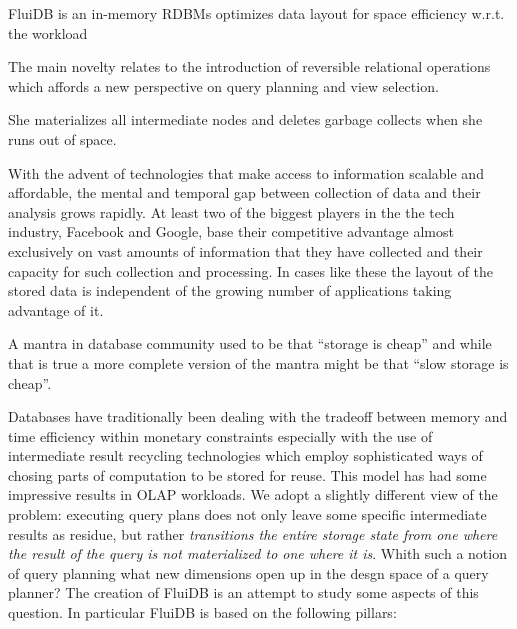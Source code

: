 
\begin{summary}
\item FluiDB is an in-memory RDBMs optimizes data layout for space
  efficiency w.r.t. the workload
\item The main novelty relates to the introduction of reversible
  relational operations which affords a new perspective on query
  planning and view selection.
\item She materializes all intermediate nodes and deletes garbage
  collects when she runs out of space.
\end{summary}

%
%
%

With the advent of technologies that make access to information
scalable and affordable, the mental and temporal gap between
collection of data and their analysis grows rapidly. At least two of
the biggest players in the the tech industry, Facebook and Google,
base their competitive advantage almost exclusively on vast amounts of
information that they have collected and their capacity for such
collection and processing. In cases like these the layout of the
stored data is independent of the growing number of applications
taking advantage of it.

A mantra in database community used to be that ``storage is cheap''
and while that is true a more complete version of the mantra might be
that ``slow storage is cheap''.

Databases have traditionally been dealing with the tradeoff between
memory and time efficiency within monetary constraints especially with
the use of intermediate result recycling technologies which employ
sophisticated ways of chosing parts of computation to be stored for
reuse. This model has had some impressive results in OLAP
workloads. We adopt a slightly different view of the problem:
executing query plans does not only leave some specific intermediate
results as residue, but rather \emph{transitions the entire storage
  state from one where the result of the query is not materialized to
  one where it is}. Whith such a notion of query planning what new
dimensions open up in the desgn space of a query planner? The creation
of FluiDB is an attempt to study some aspects of this question. In
particular FluiDB is based on the following pillars:

